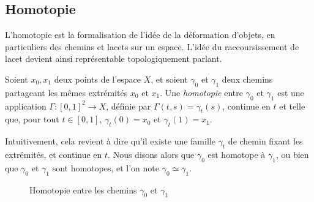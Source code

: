 \subsection{Homotopie}\label{sec:homotopy}

L'homotopie est la formalisation de l'idée de la déformation d'objets, en particuliers des chemins et lacets sur un espace. L'idée du raccoursissement de lacet devient ainsi représentable topologiquement parlant.

\begin{definition}\label{def:homotopy-paths}
Soient $x_0, x_1$ deux points de l'espace $X$, et soient $\gamma_0$ et $\gamma_1$ deux chemins partageant les mêmes extrémités $x_0$ et $x_1$. Une \emph{homotopie} entre $\gamma_0$ et $\gamma_1$ est une application $\Gamma:[0,1]^2\to X$, définie par $\Gamma(t,s)=\gamma_t(s)$, continue en $t$ et telle que, pour tout $t\in[0,1]$, $\gamma_t(0)=x_0$ et $\gamma_t(1)=x_1$.

Intuitivement, cela revient à dire qu'il existe une famille $\gamma_t$ de chemin fixant les extrémités, et continue en $t$. Nous disons alors que $\gamma_0$ est homotope à $\gamma_1$, ou bien que $\gamma_0$ et $\gamma_1$ sont homotopes, et l'on note $\gamma_0\simeq\gamma_1$.
\end{definition}

\begin{figure}[H]
    \centering
    \caption{Homotopie entre les chemins $\gamma_0$ et $\gamma_1$}
    \label{tkz:path-homotopy}
\end{figure}

